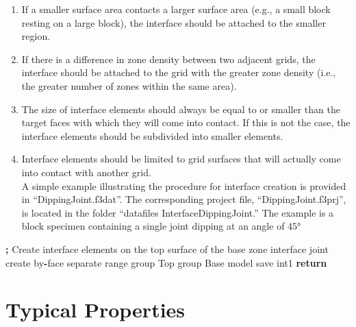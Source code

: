 \documentclass[a4paper, nobind]{templates/ociamthesis}
\providecommand{\tightlist}{%
  \setlength{\itemsep}{0pt}\setlength{\parskip}{0pt}}
\newenvironment{Shaded}{\begin{snugshade}}{\end{snugshade}}
\newcommand{\BuiltInTok}[1]{#1}
\newcommand{\ControlFlowTok}[1]{\textcolor[rgb]{0.13,0.29,0.53}{\textbf{#1}}}
\newcommand{\NormalTok}[1]{#1}
\newcommand{\OperatorTok}[1]{\textcolor[rgb]{0.81,0.36,0.00}{\textbf{#1}}}
\newcommand{\StringTok}[1]{\textcolor[rgb]{0.31,0.60,0.02}{#1}}
\renewenvironment{Shaded}
{
  \vspace{10pt}%
  \begin{snugshade}%
}{%
  \end{snugshade}%
  \vspace{8pt}%
}
\begin{document}
\begin{enumerate}
\def\labelenumi{\arabic{enumi}.}
\tightlist
\item
  If a smaller surface area contacts a larger surface area (e.g., a
  small block resting on a large block), the interface should be
  attached to the smaller region.\\
\item
  If there is a difference in zone density between two adjacent grids,
  the interface should be attached to the grid with the greater zone
  density (i.e., the greater number of zones within the same area).
\item
  The size of interface elements should always be equal to or smaller
  than the target faces with which they will come into contact. If
  this is not the case, the interface elements should be subdivided
  into smaller elements.\\
\item
  Interface elements should be limited to grid surfaces that will
  actually come into contact with another grid.\\
  A simple example illustrating the procedure for interface creation
  is provided in ``DippingJoint.f3dat''. The corresponding project file,
  ``DippingJoint.f3prj'', is located in the folder ``datafiles
  InterfaceDippingJoint.'' The example is a block specimen containing a
  single joint dipping at an angle of \(45°\)
\end{enumerate}

\begin{Shaded}
\begin{Highlighting}[]
\OperatorTok{;}\NormalTok{ Create interface elements on the top surface of the base        }
\NormalTok{zone interface }\StringTok{\textquotesingle{}joint\textquotesingle{}}\NormalTok{ create by}\OperatorTok{{-}}\NormalTok{face separate }\BuiltInTok{range}\NormalTok{ group }\StringTok{\textquotesingle{}Top\textquotesingle{}}\NormalTok{ group }\StringTok{\textquotesingle{}Base\textquotesingle{}}
\NormalTok{model save }\StringTok{\textquotesingle{}int1\textquotesingle{}}
\ControlFlowTok{return}
\end{Highlighting}
\end{Shaded}

\hypertarget{typical-properties}{%
\section{Typical Properties}\label{typical-properties}}
\end{document}
